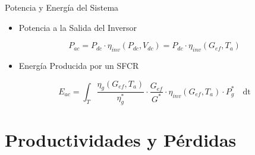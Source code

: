 \documentclass[aspectratio=169, usenames,svgnames,dvipsnames]{beamer}
\begin{document}
\begin{frame}[label={sec:org8f1b392}]{Potencia y Energía del Sistema}
\begin{itemize}
\item \alert{Potencia} a la Salida del Inversor
\end{itemize}
\[
P_{ac} = P_{dc} \cdot \eta_{inv}(P_{dc}, V_{dc}) =  P_{dc} \cdot \eta_{inv}(G_{ef}, T_a)
\]

\begin{itemize}
\item \alert{Energía} Producida por un SFCR
\end{itemize}
\[
  E_{ac} = \int_T \frac{\eta_g(G_{ef}, T_a)}{\eta_g^*} \cdot
  \frac{G_{ef}}{G^*} \cdot \eta_{inv}(G_{ef}, T_a) \cdot P_g^*\quad \mathrm{dt}
\]
\end{frame}

\section{Productividades y Pérdidas}
\label{sec:org03cf3cc}
\end{document}
